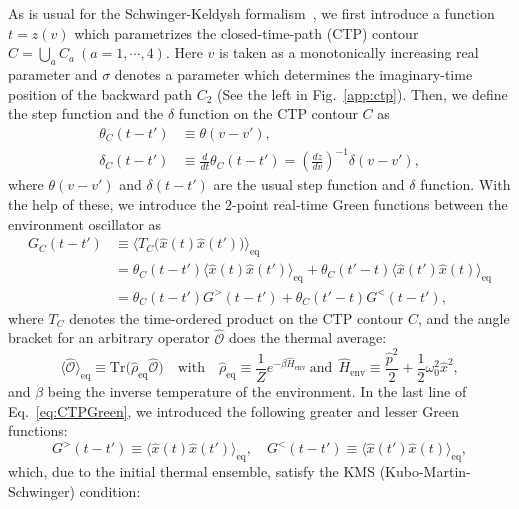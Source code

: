 \documentclass[a4paper,11pt]{article}
\newcommand{\hOcal}{{\hat{\mathcal{O}}}}
\newcommand{\with}{{\quad\mathrm{with}}\quad}
\newcommand{\hx}{\hat{x}}
\newcommand{\hp}{\hat{p}}
\newcommand{\average}[1]{\langle#1\rangle_{\mathrm{eq}}}
\begin{document}
\medskip
As is usual for the Schwinger-Keldysh formalism~\cite{Kamenev:2009jj,Bellac:2011kqa}, we first introduce a function $t = z(v)$ which parametrizes 
the closed-time-path (CTP) contour 
$C = \bigcup_a C_{a}~ (a=1,\cdots,4) $.
Here $v$ is taken as a monotonically increasing real parameter and 
$\sigma$ denotes a parameter which determines the imaginary-time 
position of the backward path $C_2$  (See the left in Fig.~\ref{app:ctp}).
Then, we define the step function and the $\delta$ function 
on the CTP contour $C$ as 
\begin{align}
 \theta_{C}(t-t') &\equiv \theta( v-v' ), \\
 \delta_{C} (t-t') 
 &\equiv \frac{d}{dt}\theta_{C}(t -t') 
 = \left( \frac{dz}{dv} \right)^{-1} \delta(v-v'),
\end{align}
where $\theta (v-v') $ and $\delta (t-t')$ are the usual step function 
and $\delta$ function.
With the help of these, we introduce the $2$-point real-time 
Green functions between the environment 
oscillator as
\begin{equation}
 \begin{split}
  G_C (t- t') 
  &\equiv 
  \average{T_C \big( \hx (t) \hx (t') \big)} \\ 
  &= \theta_C (t-t') \average{\hx (t) \hx (t')}
  + \theta_C (t'-t) \average{\hx (t') \hx (t)} \\
  &= \theta_C (t-t') G^> (t- t') 
  + \theta_C (t'-t) G^< (t- t'), 
 \end{split}
 \label{eq:CTPGreen}
\end{equation}
where $T_C$ denotes the time-ordered product on the CTP contour $C$, and
the angle bracket for an arbitrary operator $\hOcal$ does the thermal average:
\begin{equation}
 \average{\hOcal} \equiv 
  \mathrm{Tr} \big(\hat{\rho}_{\mathrm{eq}} \hOcal \big)  
  \with
  \hat{\rho}_{\mathrm{eq}} 
  \equiv \frac{1}{Z} e^{-\beta \hat{H}_{\mathrm{env}}} 
  ~\mathrm{and}~~
 \hat{H}_{\mathrm{env}} \equiv 
  \frac{\hp^2}{2} + \frac{1}{2} \omega_0^2 \hx^2 ,
\end{equation}
and $\beta$ being the inverse temperature of the environment.
In the last line of Eq.~\eqref{eq:CTPGreen}, 
we introduced the following greater and lesser Green functions:
\begin{equation}
  G^> (t- t') \equiv \average{\hx (t) \hx (t')}, \quad 
   G^<(t- t') \equiv  \average{\hx (t') \hx (t)} ,
\end{equation}
which, due to the initial thermal ensemble, 
satisfy the KMS (Kubo-Martin-Schwinger) condition:
\end{document}
